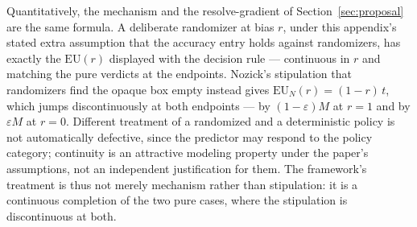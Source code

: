 Quantitatively, the mechanism and the resolve-gradient of Section~\ref{sec:proposal} are the same formula. A deliberate randomizer at bias $r$, under this appendix's stated extra assumption that the accuracy entry holds against randomizers, has exactly the $\mathrm{EU}(r)$ displayed with the decision rule --- continuous in $r$ and matching the pure verdicts at the endpoints. Nozick's stipulation that randomizers find the opaque box empty instead gives $\mathrm{EU}_{N}(r) = (1-r)\,t$, which jumps discontinuously at both endpoints --- by $(1-\varepsilon)M$ at $r = 1$ and by $\varepsilon M$ at $r = 0$. Different treatment of a randomized and a deterministic policy is not automatically defective, since the predictor may respond to the policy category; continuity is an attractive modeling property under the paper's assumptions, not an independent justification for them. The framework's treatment is thus not merely mechanism rather than stipulation: it is a continuous completion of the two pure cases, where the stipulation is discontinuous at both.

\printbibliography
